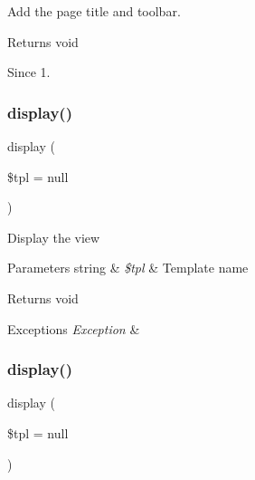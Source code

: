 Add the page title and toolbar.

\begin{DoxyReturn}{Returns}
void
\end{DoxyReturn}
\begin{DoxySince}{Since}
1. 
\end{DoxySince}
\mbox{\label{classtks__agenda_view_downloads_aa988850da0dbeb9875debea0280754d5}} 
\subsubsection{display()\hspace{0.1cm}{\footnotesize\ttfamily [1/2]}}
{\footnotesize\ttfamily display (\begin{DoxyParamCaption}\item[{}]{\$tpl = {\ttfamily null} }\end{DoxyParamCaption})}

Display the view


\begin{DoxyParams}[1]{Parameters}
string & {\em \$tpl} & Template name\\
\hline
\end{DoxyParams}
\begin{DoxyReturn}{Returns}
void
\end{DoxyReturn}

\begin{DoxyExceptions}{Exceptions}
{\em Exception} & \\
\hline
\end{DoxyExceptions}
\mbox{\label{classtks__agenda_view_downloads_aa988850da0dbeb9875debea0280754d5}} 
\subsubsection{display()\hspace{0.1cm}{\footnotesize\ttfamily [2/2]}}
{\footnotesize\ttfamily display (\begin{DoxyParamCaption}\item[{}]{\$tpl = {\ttfamily null} }\end{DoxyParamCaption})}


